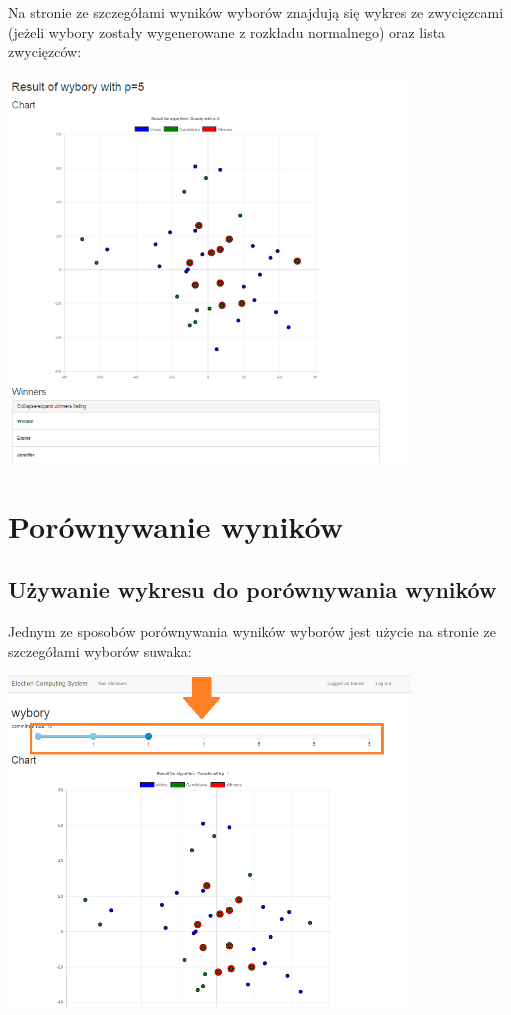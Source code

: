 \documentclass[pdflatex,11pt]{../aghdoc_version2}
\begin{document}
\vspace{\baselineskip}
Na stronie ze szczegółami wyników wyborów znajdują się wykres ze zwycięzcami (jeżeli wybory zostały wygenerowane z rozkładu normalnego) oraz lista zwycięzców: \\
\begin{center}
\includegraphics[width=0.8\textwidth]{pics/result-details_version2.png}
\end{center} 
\newpage

\section{Porównywanie wyników}
\label{sec:porownywaniewynikow}

\subsection{Używanie wykresu do porównywania wyników}
\label{subsec:pornawykresie}
Jednym ze sposobów porównywania wyników wyborów jest użycie na stronie ze szczegółami wyborów suwaka: \\

\begin{center}
\includegraphics[width=0.8\textwidth]{pics/results_suwak.png}
\end{center}
\end{document}
